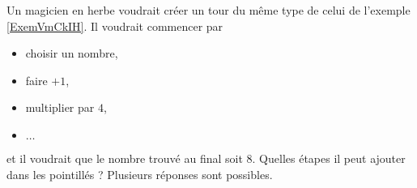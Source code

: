 
\begin{exercice}\label{exoSeconde-0048}

    Un magicien en herbe voudrait créer un tour du même type de celui de l'exemple \ref{ExemVmCkIH}. Il voudrait commencer par
    \begin{itemize}
        \item choisir un nombre,
        \item faire \( +1\),
        \item multiplier par \( 4\),
        \item \( \ldots\)
    \end{itemize}
    et il voudrait que le nombre trouvé au final soit \( 8\). Quelles étapes il peut ajouter dans les pointillés ? Plusieurs réponses sont possibles.

\end{exercice}
